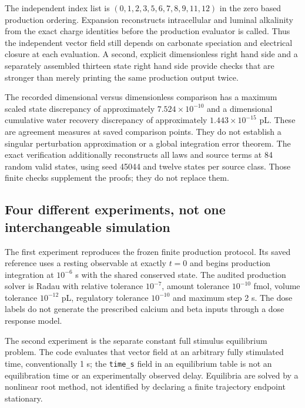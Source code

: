 The independent index list is $(0,1,2,3,5,6,7,8,9,11,12)$ in the zero based production ordering. Expansion reconstructs intracellular and luminal alkalinity from the exact charge identities before the production evaluator is called. Thus the independent vector field still depends on carbonate speciation and electrical closure at each evaluation. A second, explicit dimensionless right hand side and a separately assembled thirteen state right hand side provide checks that are stronger than merely printing the same production output twice.

The recorded dimensional versus dimensionless comparison has a maximum scaled state discrepancy of approximately $7.524\times10^{-10}$ and a dimensional cumulative water recovery discrepancy of approximately $1.443\times10^{-15}$ pL. These are agreement measures at saved comparison points. They do not establish a singular perturbation approximation or a global integration error theorem. The exact verification additionally reconstructs all laws and source terms at 84 random valid states, using seed 45044 and twelve states per source class. Those finite checks supplement the proofs; they do not replace them.

\subsection{Four different experiments, not one interchangeable simulation}
The first experiment reproduces the frozen finite production protocol. Its saved reference uses a resting observable at exactly $t=0$ and begins production integration at $10^{-6}$ s with the shared conserved state. The audited production solver is Radau with relative tolerance $10^{-7}$, amount tolerance $10^{-10}$ fmol, volume tolerance $10^{-12}$ pL, regulatory tolerance $10^{-10}$ and maximum step 2 s. The dose labels do not generate the prescribed calcium and beta inputs through a dose response model.

The second experiment is the separate constant full stimulus equilibrium problem. The code evaluates that vector field at an arbitrary fully stimulated time, conventionally 1 s; the \texttt{time\_s} field in an equilibrium table is not an equilibration time or an experimentally observed delay. Equilibria are solved by a nonlinear root method, not identified by declaring a finite trajectory endpoint stationary.

